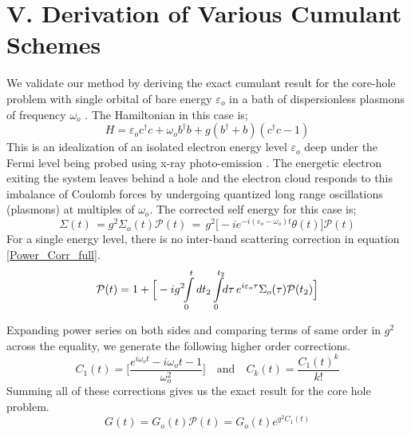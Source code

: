 \documentclass[%
 reprint,
 amsmath,amssymb,
 aps,prl,
floatfix
]{revtex4-2}
\begin{document}
\section{V. Derivation of Various Cumulant Schemes }
We validate our method by deriving the exact cumulant result for the core-hole problem with single orbital of bare energy $\varepsilon_o$ in a bath of dispersionless plasmons of frequency $\omega_o$ \cite{langreth_singularities_1970}. The Hamiltonian in this case is;
\begin{equation*}
    \label{Core hole}
    H = \varepsilon_o c^\dagger c + \omega_o b^\dagger b + g (b^\dagger + b)(c^\dagger c -1)
\end{equation*}
This is an idealization of an isolated electron energy level $\varepsilon_o$ deep under the Fermi level being probed using x-ray photo-emission \cite{offi_comparison_2007}. The energetic electron exiting the system leaves behind a hole and the electron cloud responds to this imbalance of Coulomb forces by undergoing quantized long range oscillations (plasmons) at multiples of $\omega_o$. The corrected self energy for this case is;
\begin{equation*}
        \Sigma(t) \,= g^2 \Sigma_o(t)\mathcal{P}(t)\, =\, g^2 \big[-ie^{-i(\varepsilon_o-\omega_o)t} \theta(t)\big] \mathcal{P}(t)
\end{equation*}
For a single energy level, there is no inter-band scattering correction in equation \eqref{Power_Corr_full}.
\begin{equation*}
    \begin{aligned}
        \mathcal{P}(t)=1+ \Big[-ig^2\!\!\int\displaylimits_{0}^{t} dt_2 \int\displaylimits_{0}^{t_2}\!\!d{\tau}\, e^{i\varepsilon_{o}\tau}\Sigma_o(\tau)\mathcal{P}(t_2)\Big]
    \end{aligned}
    \label{single-disp-boson}
\end{equation*}

Expanding power series on both sides and comparing terms of same order in $g^2$ across the equality, we generate the following higher order corrections.
\begin{equation*}
    C_1(t) = \Big[\frac{e^{i\omega_o t} - i\omega_o t -1}{\omega_o^2}\Big] \quad \text{and}\quad C_k (t) = \frac{C_1(t)^k}{k!}
\end{equation*}
Summing all of these corrections gives us the exact result for the core hole problem.
\begin{equation}
G(t) = G_o(t)\mathcal{P}(t) = G_o(t)e^{g^2 C_1(t)}
\label{core-hole-cumulant}
\end{equation}
\end{document}
